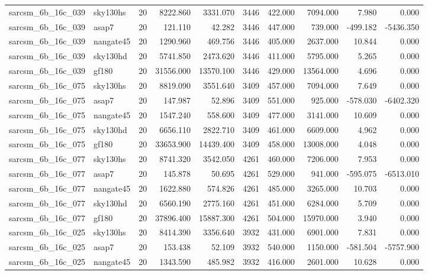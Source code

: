 \documentclass{article}
\begin{document}
\begin{longtable}{llrrrrrrrr}
sarcsm\_6b\_16c\_039 & sky130hs & 20 & 8222.860 & 3331.070 & 3446 & 422.000 & 7094.000 & 7.980 & 0.000 \\
sarcsm\_6b\_16c\_039 & asap7 & 20 & 121.110 & 42.282 & 3446 & 447.000 & 739.000 & -499.182 & -5436.350 \\
sarcsm\_6b\_16c\_039 & nangate45 & 20 & 1290.960 & 469.756 & 3446 & 405.000 & 2637.000 & 10.844 & 0.000 \\
sarcsm\_6b\_16c\_039 & sky130hd & 20 & 5741.850 & 2473.620 & 3446 & 411.000 & 5795.000 & 5.265 & 0.000 \\
sarcsm\_6b\_16c\_039 & gf180 & 20 & 31556.000 & 13570.100 & 3446 & 429.000 & 13564.000 & 4.696 & 0.000 \\
sarcsm\_6b\_16c\_075 & sky130hs & 20 & 8819.090 & 3551.640 & 3409 & 457.000 & 7094.000 & 7.649 & 0.000 \\
sarcsm\_6b\_16c\_075 & asap7 & 20 & 147.987 & 52.896 & 3409 & 551.000 & 925.000 & -578.030 & -6402.320 \\
sarcsm\_6b\_16c\_075 & nangate45 & 20 & 1547.240 & 558.600 & 3409 & 477.000 & 3141.000 & 10.609 & 0.000 \\
sarcsm\_6b\_16c\_075 & sky130hd & 20 & 6656.110 & 2822.710 & 3409 & 461.000 & 6609.000 & 4.962 & 0.000 \\
sarcsm\_6b\_16c\_075 & gf180 & 20 & 33653.900 & 14439.400 & 3409 & 458.000 & 13008.000 & 4.048 & 0.000 \\
sarcsm\_6b\_16c\_077 & sky130hs & 20 & 8741.320 & 3542.050 & 4261 & 460.000 & 7206.000 & 7.953 & 0.000 \\
sarcsm\_6b\_16c\_077 & asap7 & 20 & 145.878 & 50.695 & 4261 & 529.000 & 941.000 & -595.075 & -6513.010 \\
sarcsm\_6b\_16c\_077 & nangate45 & 20 & 1622.880 & 574.826 & 4261 & 485.000 & 3265.000 & 10.703 & 0.000 \\
sarcsm\_6b\_16c\_077 & sky130hd & 20 & 6560.190 & 2775.160 & 4261 & 451.000 & 6284.000 & 5.709 & 0.000 \\
sarcsm\_6b\_16c\_077 & gf180 & 20 & 37896.400 & 15887.300 & 4261 & 504.000 & 15970.000 & 3.940 & 0.000 \\
sarcsm\_6b\_16c\_025 & sky130hs & 20 & 8414.390 & 3356.640 & 3932 & 431.000 & 6901.000 & 7.831 & 0.000 \\
sarcsm\_6b\_16c\_025 & asap7 & 20 & 153.438 & 52.109 & 3932 & 540.000 & 1150.000 & -581.504 & -5757.900 \\
sarcsm\_6b\_16c\_025 & nangate45 & 20 & 1343.590 & 485.982 & 3932 & 416.000 & 2601.000 & 10.628 & 0.000 \\

\end{longtable}
\end{document}
